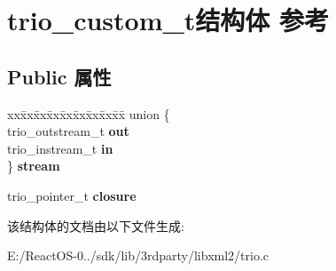 \hypertarget{structtrio__custom__t}{}\section{trio\+\_\+custom\+\_\+t结构体 参考}
\label{structtrio__custom__t}
\subsection*{Public 属性}
\begin{DoxyCompactItemize}
\item 
\mbox{\label{structtrio__custom__t_ab825fb177bf16a6cee5d954eea31a289}} 
\begin{tabbing}
xx\=xx\=xx\=xx\=xx\=xx\=xx\=xx\=xx\=\kill
union \{\\
\>trio\_outstream\_t {\bfseries out}\\
\>trio\_instream\_t {\bfseries in}\\
\} {\bfseries stream}\\

\end{tabbing}\item 
\mbox{\label{structtrio__custom__t_a07ff6216a31914cd7030b7fb1de8e4a6}} 
trio\+\_\+pointer\+\_\+t {\bfseries closure}
\end{DoxyCompactItemize}


该结构体的文档由以下文件生成\+:\begin{DoxyCompactItemize}
\item 
E\+:/\+React\+O\+S-\/0../sdk/lib/3rdparty/libxml2/trio.\+c\end{DoxyCompactItemize}
